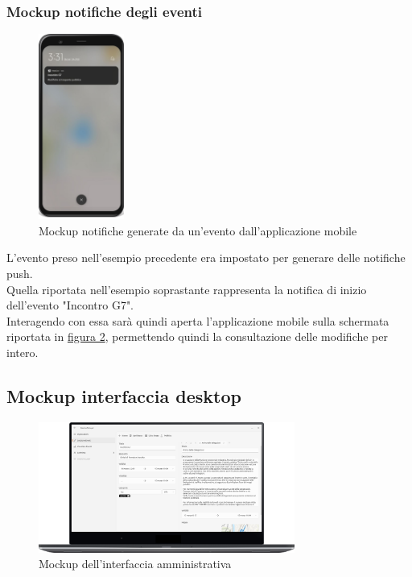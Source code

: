\documentclass{article}
\begin{document}
\subsubsection{Mockup notifiche degli eventi}

\begin{figure}[htbp]
    \label{fig:Notifica_evento}
    \centering
    \includegraphics[width=0.25\textwidth]{Images/Mockup3 - Mobile.png}
    \caption{Mockup notifiche generate da un'evento dall'applicazione mobile}
\end{figure}

L'evento preso nell'esempio precedente era impostato per generare delle notifiche push.\\
Quella riportata nell'esempio soprastante rappresenta la notifica di inizio dell'evento "Incontro G7".\\
Interagendo con essa sarà quindi aperta l'applicazione mobile sulla schermata riportata in \hyperref[fig:Dettaglio_evento]{figura 2}, permettendo quindi la consultazione delle modifiche per intero.\\

\clearpage

\subsection{Mockup interfaccia desktop}
\begin{figure}[htbp]
    \label{fig:Schermata_principale_desktop}
    \centering
    \includegraphics[width=0.75\textwidth]{Images/Mockup1 - Desktop.png}
    \caption{Mockup dell'interfaccia amministrativa}
\end{figure}
\end{document}
